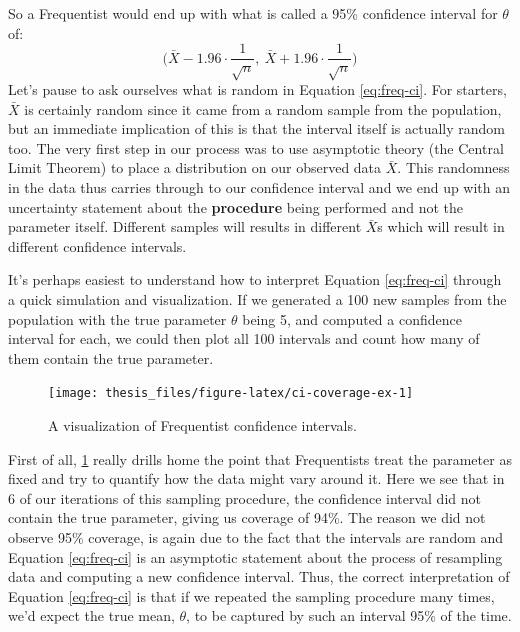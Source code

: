 \documentclass[12pt,twoside]{reedthesis}
\begin{document}
So a Frequentist would end up with what is called a 95\% confidence interval for \(\theta\) of:
\begin{equation}
  \bigg(\bar{X} - 1.96\cdot\frac{1}{\sqrt{n}}, \ \bar{X} + 1.96\cdot\frac{1}{\sqrt{n}}\bigg)
  \label{eq:freq-ci}
\end{equation}
Let's pause to ask ourselves what is random in Equation \eqref{eq:freq-ci}. For starters, \(\bar{X}\) is certainly random since it came from a random sample from the population, but an immediate implication of this is that the interval itself is actually random too. The very first step in our process was to use asymptotic theory (the Central Limit Theorem) to place a distribution on our observed data \(\bar{X}\). This randomness in the data thus carries through to our confidence interval and we end up with an uncertainty statement about the \textbf{procedure} being performed and not the parameter itself. Different samples will results in different \(\bar{X}\)s which will result in different confidence intervals.

It's perhaps easiest to understand how to interpret Equation \eqref{eq:freq-ci} through a quick simulation and visualization. If we generated a 100 new samples from the population with the true parameter \(\theta\) being 5, and computed a confidence interval for each, we could then plot all 100 intervals and count how many of them contain the true parameter.
\begin{figure}

{\centering \texttt{[image: thesis\_files/figure-latex/ci-coverage-ex-1]} 

}

\caption{A visualization of Frequentist confidence intervals.}\label{fig:ci-coverage-ex}
\end{figure}
First of all, \ref{fig:ci-coverage-ex} really drills home the point that Frequentists treat the parameter as fixed and try to quantify how the data might vary around it. Here we see that in 6 of our iterations of this sampling procedure, the confidence interval did not contain the true parameter, giving us coverage of 94\%. The reason we did not observe 95\% coverage, is again due to the fact that the intervals are random and Equation \eqref{eq:freq-ci} is an asymptotic statement about the process of resampling data and computing a new confidence interval. Thus, the correct interpretation of Equation \eqref{eq:freq-ci} is that if we repeated the sampling procedure many times, we'd expect the true mean, \(\theta\), to be captured by such an interval 95\% of the time.
\end{document}
